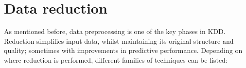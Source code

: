 \documentclass[preprint,12pt]{elsarticle}
\begin{document}
\section{Data reduction}
\label{sec:datared}

As mentioned before, data preprocessing is one of the key phases in KDD. Reduction simplifies input data, whilst maintaining its original structure and quality; sometimes with improvements in predictive performance. Depending on where reduction is performed, different families of techniques can be listed:
\end{document}
